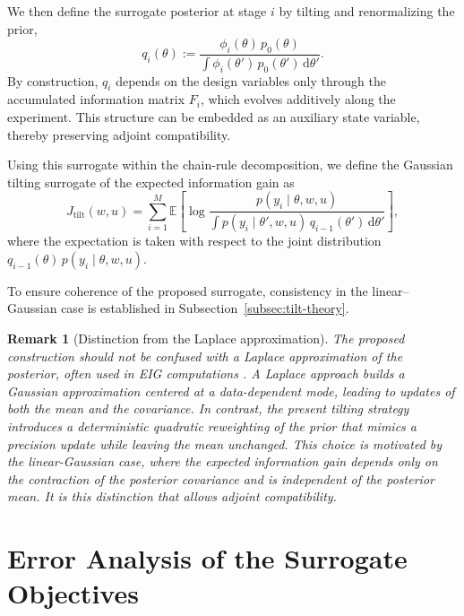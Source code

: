 \documentclass[a4paper,11pt]{article}
\newtheorem{remark}{Remark}
\begin{document}
We then define the surrogate posterior at stage \(i\) by tilting and renormalizing the prior,
\begin{equation}
q_i(\theta)
:=
\frac{
  \phi_i(\theta)\,p_0(\theta)
}{
  \displaystyle
  \int \phi_i(\theta')\,p_0(\theta')\,\mathrm d\theta'
}. \label{eq:tilt_mechanism}
\end{equation}
By construction, \(q_i\) depends on the design variables only through the accumulated information matrix \(F_i\), which evolves additively along the experiment. This structure can be embedded as an auxiliary state variable, thereby preserving adjoint compatibility.

Using this surrogate within the chain-rule decomposition, we define the Gaussian tilting surrogate of the expected information gain as
\begin{equation}
J_{\mathrm{tilt}}(w,u)
=
\sum_{i=1}^M
\mathbb{E}\left[
  \log
  \frac{
    p\!\left(y_i \mid \theta, w, u\right)
  }{
    \displaystyle
    \int
    p\!\left(y_i \mid \theta', w, u\right)\,
    q_{i-1}(\theta')\,
    \mathrm d\theta'
  }
\right],
\end{equation}
where the expectation is taken with respect to the joint distribution
$q_{i-1}(\theta)\,p(y_i \mid \theta,w,u)$.


To ensure coherence of the proposed surrogate, consistency in the linear--Gaussian case is established in Subsection~\ref{subsec:tilt-theory}.
\begin{remark}[Distinction from the Laplace approximation]
The proposed construction should not be confused with a Laplace approximation of the posterior, often used in EIG computations \cite{Long2013,Lewi2009}. A Laplace approach builds a Gaussian approximation centered at a data-dependent mode, leading to updates of both the mean and the covariance. In contrast, the present tilting strategy introduces a deterministic quadratic reweighting of the prior that mimics a precision update while leaving the mean unchanged. This choice is motivated by the linear-Gaussian case, where the expected information gain depends only on the contraction of the posterior covariance and is independent of the posterior mean. It is this distinction that allows adjoint compatibility.
\end{remark}

\section{Error Analysis of the Surrogate Objectives}\label{sec:theory}
\end{document}
